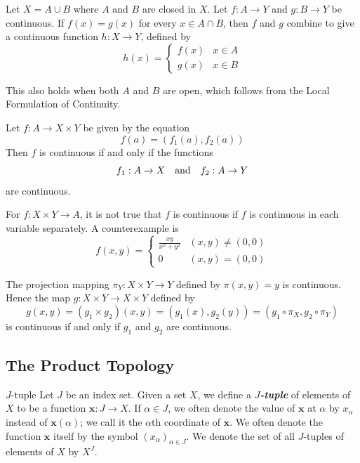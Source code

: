 \documentclass[12pt,a4paper]{article}
\begin{document}
    \begin{thm}
        Let $X=A\cup B$ where $A$ and $B$ are closed in $X$. Let $f:A\to Y$ and $g:B\to Y$ be continuous. If $f(x)=g(x)$ for every $x\in A\cap B$, then $f$ and $g$ combine to give a continuous function $h:X\to Y$, defined by
        $$
        h(x)=\begin{cases}
            f(x)&x\in A\\
            g(x)&x\in B
        \end{cases}
        $$
    \end{thm}
    \begin{remark}
        This also holds when both $A$ and $B$ are open, which follows from the Local Formulation of Continuity.
    \end{remark}
    \hfill

    \begin{thm}
        Let $f:A\to X\times Y$ be given by the equation
        $$
        f(a)=(f_1(a),f_2(a))
        $$
        Then $f$ is continuous if and only if the functions
        $$
        f_1:A\to X\quad\text{and}\quad f_2:A\to Y
        $$
        are continuous.
    \end{thm}
    \begin{remark}
        For $f:X\times Y\to A$, it is not true that $f$ is continuous if $f$ is continuous in each variable separately. A counterexample is 
        $$
        f(x,y)=\begin{cases}
            \frac{xy}{x^2+y^2}&(x,y)\neq(0,0)\\
            0&(x,y)=(0,0)
        \end{cases}
        $$
    \end{remark}
    \begin{remark}
        The projection mapping $\pi_Y:X\times Y\to Y$ defined by $\pi(x,y)=y$ is continuous. Hence the map $g:X\times Y\to X\times Y$ defined by
        $$
        g(x,y)=(g_1\times g_2)(x,y)=(g_1(x),g_2(y))=(g_1\circ\pi_X,g_2\circ\pi_Y)
        $$
        is continuous if and only if $g_1$ and $g_2$ are continuous.
    \end{remark}
    \hfill

    \subsection{The Product Topology}
    \begin{defi}{$J$-tuple}
        Let $J$ be an index set. Given a set $X$, we define a \textbf{\textit{$J$-tuple}} of elements of $X$ to be a function $\mathbf{x}:J\to X$. If $\alpha\in J$, we often denote the value of $\mathbf{x}$ at $\alpha$ by $x_{\alpha}$ instead of $\mathbf{x}(\alpha)$; we call it the $\alpha$th coordinate of $\mathbf{x}$. We often denote the function $\mathbf{x}$ itself by the symbol $(x_\alpha)_{\alpha\in J}$. We denote the set of all $J$-tuples of elements of $X$ by $X^J$.
    \end{defi}
    \hfill
    
\end{document}
